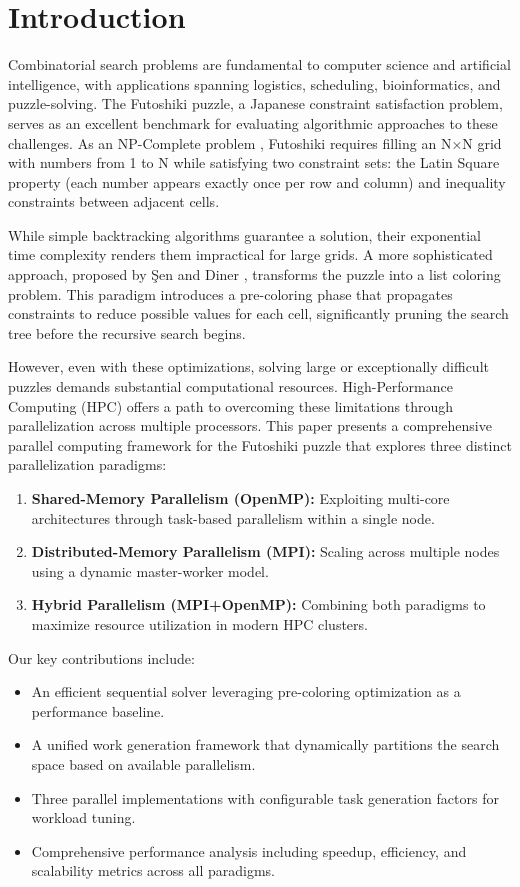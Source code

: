 \section{Introduction}
Combinatorial search problems are fundamental to computer science and artificial intelligence, with applications spanning logistics, scheduling, bioinformatics, and puzzle-solving. The Futoshiki puzzle, a Japanese constraint satisfaction problem, serves as an excellent benchmark for evaluating algorithmic approaches to these challenges. As an NP-Complete problem \cite{Sen2024Futoshiki}, Futoshiki requires filling an N×N grid with numbers from 1 to N while satisfying two constraint sets: the Latin Square property (each number appears exactly once per row and column) and inequality constraints between adjacent cells.

While simple backtracking algorithms guarantee a solution, their exponential time complexity renders them impractical for large grids. A more sophisticated approach, proposed by Şen and Diner \cite{Sen2024Futoshiki}, transforms the puzzle into a list coloring problem. This paradigm introduces a pre-coloring phase that propagates constraints to reduce possible values for each cell, significantly pruning the search tree before the recursive search begins.

However, even with these optimizations, solving large or exceptionally difficult puzzles demands substantial computational resources. High-Performance Computing (HPC) offers a path to overcoming these limitations through parallelization across multiple processors. This paper presents a comprehensive parallel computing framework for the Futoshiki puzzle that explores three distinct parallelization paradigms:

\begin{enumerate}
    \item \textbf{Shared-Memory Parallelism (OpenMP):} Exploiting multi-core architectures through task-based parallelism within a single node.
    \item \textbf{Distributed-Memory Parallelism (MPI):} Scaling across multiple nodes using a dynamic master-worker model.
    \item \textbf{Hybrid Parallelism (MPI+OpenMP):} Combining both paradigms to maximize resource utilization in modern HPC clusters.
\end{enumerate}

Our key contributions include:
\begin{itemize}
    \item An efficient sequential solver leveraging pre-coloring optimization as a performance baseline.
    \item A unified work generation framework that dynamically partitions the search space based on available parallelism.
    \item Three parallel implementations with configurable task generation factors for workload tuning.
    \item Comprehensive performance analysis including speedup, efficiency, and scalability metrics across all paradigms.
\end{itemize}